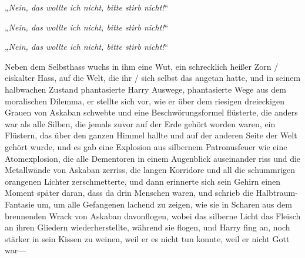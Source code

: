 „\emph{Nein, das wollte ich nicht, bitte stirb nicht!}“

„\emph{Nein, das wollte ich nicht, bitte stirb nicht!}“

„\emph{Nein, das wollte ich nicht, bitte stirb nicht!}“

Neben dem Selbsthass wuchs in ihm eine Wut, ein schrecklich heißer Zorn / eiskalter Hass, auf die Welt, die ihr / sich selbst das angetan hatte, und in seinem halbwachen Zustand phantasierte Harry Auswege, phantasierte Wege aus dem moralischen Dilemma, er stellte sich vor, wie er über dem riesigen dreieckigen Grauen von Askaban schwebte und eine Beschwörungsformel flüsterte, die anders war als alle Silben, die jemals zuvor auf der Erde gehört worden waren, ein Flüstern, das über den ganzen Himmel hallte und auf der anderen Seite der Welt gehört wurde, und es gab eine Explosion aus silbernem Patronusfeuer wie eine Atomexplosion, die alle Dementoren in einem Augenblick auseinander riss und die Metallwände von Askaban zerriss, die langen Korridore und all die schummrigen orangenen Lichter zerschmetterte, und dann erinnerte sich sein Gehirn einen Moment später daran, dass da drin Menschen waren, und schrieb die Halbtraum-Fantasie um, um alle Gefangenen lachend zu zeigen, wie sie in Scharen aus dem brennenden Wrack von Askaban davonflogen, wobei das silberne Licht das Fleisch an ihren Gliedern wiederherstellte, während sie flogen, und Harry fing an, noch stärker in sein Kissen zu weinen, weil er es nicht tun konnte, weil er nicht Gott war—

